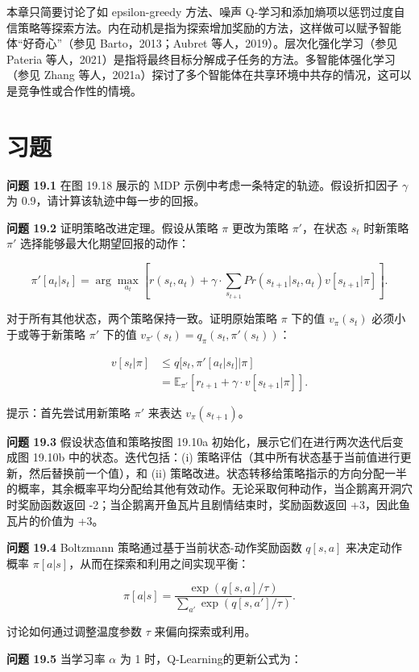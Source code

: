 本章只简要讨论了如 epsilon-greedy 方法、噪声 Q-学习和添加熵项以惩罚过度自信策略等探索方法。内在动机是指为探索增加奖励的方法，这样做可以赋予智能体“好奇心”（参见 Barto，2013；Aubret 等人，2019）。层次化强化学习（参见 Pateria 等人，2021）是指将最终目标分解成子任务的方法。多智能体强化学习（参见 Zhang 等人，2021a）探讨了多个智能体在共享环境中共存的情况，这可以是竞争性或合作性的情境。


\section{习题}
\textbf{问题 19.1} 在图 19.18 展示的 MDP 示例中考虑一条特定的轨迹。假设折扣因子 \(\gamma\) 为 0.9，请计算该轨迹中每一步的回报。

\textbf{问题 19.2} 证明策略改进定理。假设从策略 \(\pi\) 更改为策略 \(\pi'\)，在状态 \(s_t\) 时新策略 \(\pi'\) 选择能够最大化期望回报的动作：

\[
\pi'[a_t|s_t] = \arg\max_{a_t} \left[ r(s_t, a_t) + \gamma \cdot \sum_{s_{t+1}} Pr(s_{t+1} | s_t, a_t)v[s_{t+1} | \pi] \right]. \tag{19.43}
\]

对于所有其他状态，两个策略保持一致。证明原始策略 \(\pi\) 下的值 \(v_{\pi}(s_t)\) 必须小于或等于新策略 \(\pi'\) 下的值 \(v_{\pi'}(s_t) = q_{\pi}(s_t, \pi'(s_t))\)：


\begin{align}
v[s_t | \pi] &\leq q[s_t, \pi'[a_t|s_t] | \pi] \\
&= \mathbb{E}_{\pi'}[r_{t+1} + \gamma \cdot v[s_{t+1} | \pi]]. \tag{19.44}
\end{align} 


提示：首先尝试用新策略 \(\pi'\) 来表达 \(v_{\pi}(s_{t+1})\)。

\textbf{问题 19.3} 假设状态值和策略按图 19.10a 初始化，展示它们在进行两次迭代后变成图 19.10b 中的状态。迭代包括：(i) 策略评估（其中所有状态基于当前值进行更新，然后替换前一个值），和 (ii) 策略改进。状态转移给策略指示的方向分配一半的概率，其余概率平均分配给其他有效动作。无论采取何种动作，当企鹅离开洞穴时奖励函数返回 -2；当企鹅离开鱼瓦片且剧情结束时，奖励函数返回 +3，因此鱼瓦片的价值为 +3。

\textbf{问题 19.4} Boltzmann 策略通过基于当前状态-动作奖励函数 \(q[s, a]\) 来决定动作概率 \(\pi[a|s]\)，从而在探索和利用之间实现平衡：

\[
\pi[a|s] = \frac{\exp(q[s, a]/\tau)}{\sum_{a'} \exp(q[s, a']/\tau)}. \tag{19.45}
\]

讨论如何通过调整温度参数 \(\tau\) 来偏向探索或利用。

\textbf{问题 19.5} 当学习率 \(\alpha\) 为 1 时，Q-Learning的更新公式为：

